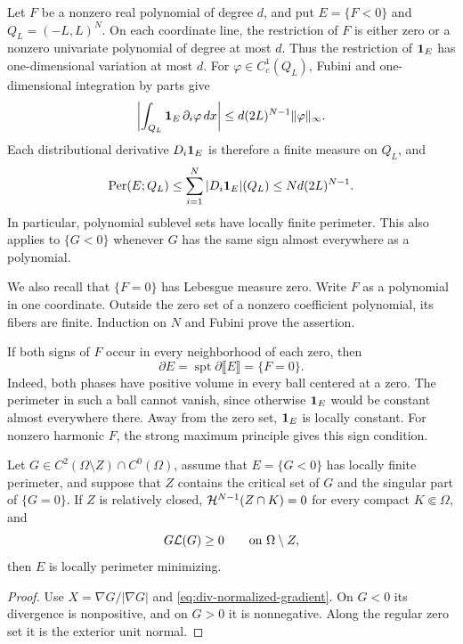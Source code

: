 \begin{remark}
\label{rem:polynomial-finite-perimeter}
Let \(F\) be a nonzero real polynomial of degree \(d\), and put
\(E=\{F<0\}\) and \(Q_L=(-L,L)^N\).
On each coordinate line, the restriction of \(F\) is either zero
or a nonzero univariate polynomial of degree at most \(d\).
Thus the restriction of \(\mathbf 1_E\) has one-dimensional variation
at most \(d\). For \(\varphi\in C_c^1(Q_L)\), Fubini and
one-dimensional integration by parts give
\[
 \left|\int_{Q_L}\mathbf 1_E\,\partial_i\varphi\,dx\right|
 \leq d(2L)^{N-1}\|\varphi\|_\infty.
\]
Each distributional derivative \(D_i\mathbf 1_E\) is therefore a finite
measure on \(Q_L\), and
\[
 \operatorname{Per}(E;Q_L)\leq\sum_{i=1}^N|D_i\mathbf 1_E|(Q_L)
 \leq Nd(2L)^{N-1}.
\]
In particular, polynomial sublevel sets have locally finite perimeter.
This also applies to \(\{G<0\}\) whenever \(G\) has the same sign
almost everywhere as a polynomial.

We also recall that \(\{F=0\}\) has Lebesgue measure zero.
Write \(F\) as a polynomial in one coordinate. Outside the zero
set of a nonzero coefficient polynomial, its fibers are finite.
Induction on \(N\) and Fubini prove the assertion.

If both signs of \(F\) occur in every neighborhood of each zero, then
\[
 \partial E=\operatorname{spt}\partial\llbracket E\rrbracket
 =\{F=0\}.
\]
Indeed, both phases have positive volume in every ball centered at
a zero. The perimeter in such a ball cannot vanish, since otherwise
\(\mathbf 1_E\) would be constant almost everywhere there. Away from
the zero set, \(\mathbf 1_E\) is locally constant.
For nonzero harmonic \(F\), the strong maximum principle gives this
sign condition.
\end{remark}

\begin{corollary}
\label{cor:gradient-subcalibration}
Let \(G\in C^2(\Omega\setminus Z)\cap C^0(\Omega)\), assume that
\(E=\{G<0\}\) has locally finite perimeter, and suppose that \(Z\) contains
the critical set of \(G\) and the singular part of \(\{G=0\}\).
If \(Z\) is relatively closed, \(\mathcal H^{N-1}(Z\cap K)=0\) for every
compact \(K\Subset\Omega\), and
\[
 G\mathcal L(G)\geq0\qquad\text{on }\Omega\setminus Z,
\]
then \(E\) is locally perimeter minimizing.
\end{corollary}

\begin{proof}
Use \(X=\nabla G/|\nabla G|\) and
\eqref{eq:div-normalized-gradient}.  On \(G<0\) its divergence is
nonpositive, and on \(G>0\) it is nonnegative.  Along the regular zero set it
is the exterior unit normal.
\end{proof}

